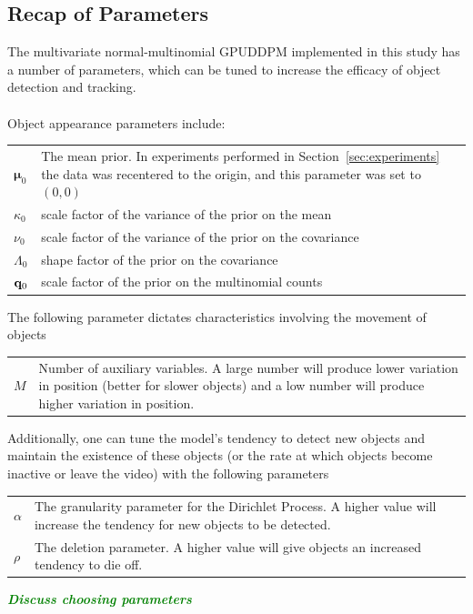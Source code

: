 \documentclass[smallcondensed, final]{svjour3}
\newcommand{\willie}[1]{\textcolor{green}{\textsf{\emph{\textbf{\textcolor{green}{#1}}}}}}
\begin{document}

\subsection{Recap of Parameters}
\label{sec:parameter_recap}

The multivariate normal-multinomial GPUDDPM implemented in this study has a number of parameters, which can be tuned to increase the efficacy of object detection and tracking. \\ \\
Object appearance parameters include:
\begin{center}
\begin{tabular}[c]{l p{10cm}}
$\boldsymbol{\mu}_{0}$  &  The mean prior. In experiments performed in Section~\ref{sec:experiments} the data was recentered to the origin, and this parameter was set to $(0,0)$ \\
$\kappa_{0}$  &  scale factor of the variance of the prior on the mean\\
$\nu_{0}$  &  scale factor of the variance of the prior on the covariance\\
$\Lambda_{0}$  &  shape factor of the prior on the covariance\\
$\bold{q}_{0}$  &  scale factor of the prior on the multinomial counts
\end{tabular}
\end{center} \vspace{3mm}
The following parameter dictates characteristics involving the movement of objects
\begin{center}
\begin{tabular}[c]{l p{10cm}}
$M$  &  Number of auxiliary variables. A large number will produce lower variation in position (better for slower objects) and a low number will produce higher variation in position.
\end{tabular}
\end{center} \vspace{3mm}
Additionally, one can tune the model's tendency to detect new objects and maintain the existence of these objects (or the rate at which objects become inactive or leave the video) with the following parameters
\begin{center}
\begin{tabular}[c]{l p{10cm}}
$\alpha$  &  The granularity parameter for the Dirichlet Process. A higher value will increase the tendency for new objects to be detected.\\
$\rho$  &  The deletion parameter. A higher value will give objects an increased tendency to die off.
\end{tabular}
\end{center}
\willie{Discuss choosing parameters}
\end{document}
